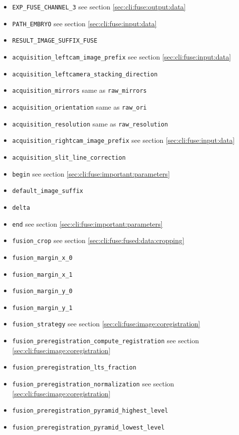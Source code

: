 \begin{itemize}
\item \texttt{EXP\_FUSE\_CHANNEL\_3} see section \ref{sec:cli:fuse:output:data}
\item \texttt{PATH\_EMBRYO} see section \ref{sec:cli:fuse:input:data}
\item \texttt{RESULT\_IMAGE\_SUFFIX\_FUSE}
\item \texttt{acquisition\_leftcam\_image\_prefix}  see section \ref{sec:cli:fuse:input:data}
\item \texttt{acquisition\_leftcamera\_stacking\_direction}
\item \texttt{acquisition\_mirrors} same as \texttt{raw\_mirrors}
\item \texttt{acquisition\_orientation} same as \texttt{raw\_ori}
\item \texttt{acquisition\_resolution} same as \texttt{raw\_resolution}
\item \texttt{acquisition\_rightcam\_image\_prefix}  see section \ref{sec:cli:fuse:input:data}
\item \texttt{acquisition\_slit\_line\_correction}
\item \texttt{begin} see section \ref{sec:cli:fuse:important:parameters}
\item \texttt{default\_image\_suffix}
\item \texttt{delta}
\item \texttt{end} see section \ref{sec:cli:fuse:important:parameters}
\item \texttt{fusion\_crop} see section \ref{sec:cli:fuse:fused:data:cropping}
\item \texttt{fusion\_margin\_x\_0}
\item \texttt{fusion\_margin\_x\_1}
\item \texttt{fusion\_margin\_y\_0}
\item \texttt{fusion\_margin\_y\_1}
\item \texttt{fusion\_strategy}  see section \ref{sec:cli:fuse:image:coregistration}
\item \texttt{fusion\_preregistration\_compute\_registration} see section \ref{sec:cli:fuse:image:coregistration}
\item \texttt{fusion\_preregistration\_lts\_fraction}
\item \texttt{fusion\_preregistration\_normalization} see section \ref{sec:cli:fuse:image:coregistration}
\item \texttt{fusion\_preregistration\_pyramid\_highest\_level}
\item \texttt{fusion\_preregistration\_pyramid\_lowest\_level}

\end{itemize}

